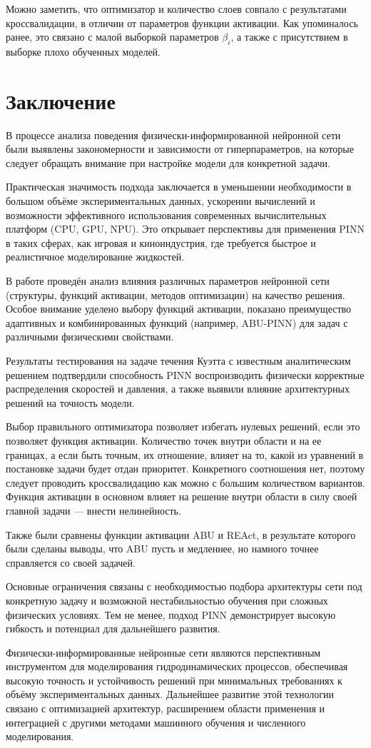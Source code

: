 Можно заметить, что оптимизатор и количество слоев совпало
с результатами кроссвалидации, в отличии от параметров
функции активации. Как упоминалось ранее, это связано с
малой выборкой параметров $\beta_i$, а также с присутствием
в выборке плохо обученных моделей. 

\chapter*{Заключение}

В процессе анализа поведения физически-информированной нейронной сети были выявлены
закономерности и зависимости от гиперпараметров, на которые следует обращать внимание
при настройке модели для конкретной задачи.

Практическая значимость подхода заключается в уменьшении необходимости в большом объёме
экспериментальных данных, ускорении вычислений и возможности эффективного использования
современных вычислительных платформ (CPU, GPU, NPU). Это открывает перспективы для применения
PINN в таких сферах, как игровая и киноиндустрия, где требуется быстрое и реалистичное
моделирование жидкостей.

В работе проведён анализ влияния различных параметров нейронной сети (структуры, функций
активации, методов оптимизации) на качество решения. Особое внимание уделено выбору
функций активации, показано преимущество адаптивных и комбинированных функций (например,
ABU-PINN) для задач с различными физическими свойствами.

Результаты тестирования на задаче течения Куэтта с известным аналитическим решением подтвердили
способность PINN воспроизводить физически корректные распределения скоростей и давления,
а также выявили влияние архитектурных решений на точность модели.

Выбор правильного оптимизатора позволяет избегать нулевых решений, если это позволяет
функция активации. Количество точек внутри области и на ее границах, а если быть точным,
их отношение, влияет на то, какой из уравнений в постановке задачи будет отдан приоритет.
Конкретного соотношения нет, поэтому следует проводить кроссвалидацию как можно с большим
количеством вариантов. Функция активации в основном влияет на решение внутри области в
силу своей главной задачи --- внести нелинейность. 

Также были сравнены функции активации ABU и REAct, в результате которого были сделаны выводы,
что ABU пусть и медленнее, но намного точнее справляется со своей задачей.

Основные ограничения связаны с необходимостью подбора архитектуры сети под конкретную задачу
и возможной нестабильностью обучения при сложных физических условиях. Тем не менее, подход PINN
демонстрирует высокую гибкость и потенциал для дальнейшего развития.

Физически-информированные нейронные сети являются перспективным инструментом для моделирования
гидродинамических процессов, обеспечивая высокую точность и устойчивость решений при минимальных
требованиях к объёму экспериментальных данных. Дальнейшее развитие этой технологии связано с
оптимизацией архитектур, расширением области применения и интеграцией с другими методами машинного
обучения и численного моделирования.
